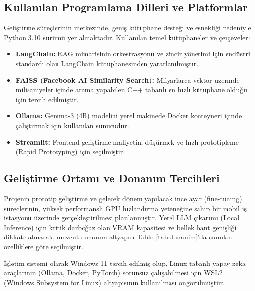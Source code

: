 \documentclass[12pt,a4paper]{report}
\begin{document}
\subsection{Kullanılan Programlama Dilleri ve Platformlar}
Geliştirme süreçlerinin merkezinde, geniş kütüphane desteği ve esnekliği nedeniyle Python 3.10 sürümü yer almaktadır. Kullanılan temel kütüphaneler ve çerçeveler:
\begin{itemize}
    \item \textbf{LangChain:} RAG mimarisinin orkestrasyonu ve zincir yönetimi için endüstri standardı olan LangChain kütüphanesinden yararlanılmıştır.
    \item \textbf{FAISS (Facebook AI Similarity Search):} Milyarlarca vektör üzerinde milisaniyeler içinde arama yapabilen C++ tabanlı en hızlı kütüphane olduğu için tercih edilmiştir.
    \item \textbf{Ollama:} Gemma-3 (4B) modelini yerel makinede Docker konteyneri içinde çalıştırmak için kullanılan sunucudur.
    \item \textbf{Streamlit:} Frontend geliştirme maliyetini düşürmek ve hızlı prototipleme (Rapid Prototyping) için seçilmiştir.
\end{itemize}

\subsection{Geliştirme Ortamı ve Donanım Tercihleri}
Projenin prototip geliştirme ve gelecek dönem yapılacak ince ayar (fine-tuning) süreçlerinin, yüksek performanslı GPU hızlandırma yeteneğine sahip bir mobil iş istasyonu üzerinde gerçekleştirilmesi planlanmıştır. Yerel LLM çıkarımı (Local Inference) için kritik darboğaz olan VRAM kapasitesi ve bellek bant genişliği dikkate alınarak, mevcut donanım altyapısı Tablo \ref{tab:donanim}'da sunulan özelliklere göre seçilmiştir.

İşletim sistemi olarak Windows 11 tercih edilmiş olup, Linux tabanlı yapay zeka araçlarının (Ollama, Docker, PyTorch) sorunsuz çalışabilmesi için WSL2 (Windows Subsystem for Linux) altyapısının kullanılması öngörülmüştür.
\end{document}
